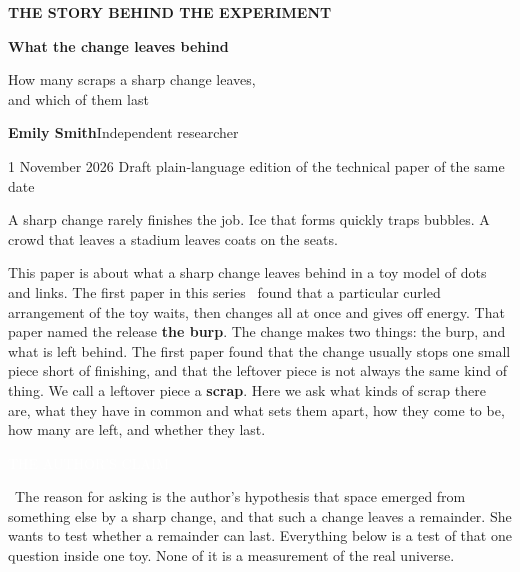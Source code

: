 \documentclass[11pt,letterpaper]{article}
\newcommand{\tagbox}[2]{{\sffamily\scriptsize\colorbox{#1}{\textcolor{white}{\strut #2}}}}
\newcommand{\Claim}{\tagbox{kClaim}{THE AUTHOR'S CLAIM}}
\begin{document}
\thispagestyle{empty}
{\color{accent}\small\textbf{THE STORY BEHIND THE EXPERIMENT}}\par
\vspace{1em}
{\color{ink}\fontsize{29}{33}\selectfont\bfseries What the change leaves behind}\par
\vspace{0.5em}
{\raggedright\Large How many scraps a sharp change leaves,\\and which of them last\par}
\vspace{0.7em}
\textbf{Emily Smith}\quad Independent researcher\par
1 November 2026 \enspace\textbullet\enspace Draft plain-language edition of the technical paper of the same date~\cite{tech}
\vspace{0.9em}

A sharp change rarely finishes the job. Ice that forms quickly traps bubbles. A crowd that leaves a
stadium leaves coats on the seats.

This paper is about what a sharp change leaves behind in a toy model of dots and links. The first
paper in this series~\cite{paper1} found that a particular curled arrangement of the toy waits, then
changes all at once and gives off energy. That paper named the release \textbf{the burp}. The change
makes two things: the burp, and what is left behind. The first paper found that the change usually
stops one small piece short of finishing, and that the leftover piece is not always the same kind of
thing. We call a leftover piece a \textbf{scrap}. Here we ask what kinds of scrap there are, what they
have in common and what sets them apart, how they come to be, how many are left, and whether they last.

\Claim\ The reason for asking is the author's hypothesis that space emerged from something else by a
sharp change, and that such a change leaves a remainder. She wants to test whether a remainder can
last. Everything below is a test of that one question inside one toy. None of it is a measurement of
the real universe.
\end{document}
